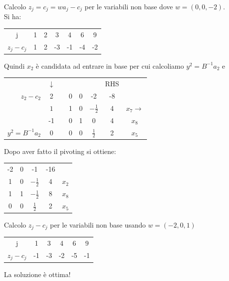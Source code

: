 Calcolo $z_{j}=c_{j}=w a_{j}-c_{j}$ per le variabili non base dove $w=(0,0,-2)$.\\
Si ha:
\begin{table}[h]
	\centering
	\begin{tabular}{c|cccccc}
		j & 1 & 2 & 3 & 4 & 6 & 9 \\ \cline{2-7}
		$z_{j}-c_{j}$ & 1 & 2 & -3 & -1 & -4 & -2
	\end{tabular}
\end{table}

Quindi $x_{2}$ è candidata ad entrare in base per cui calcoliamo $y^{2}=B^{-1}a_{2}$ e
\begin{table}[!h]
	\centering
	\def\arraystretch{1}
	\begin{tabular}{r|c|c|ccc|c|c}
		\multicolumn{1}{c}{} & \multicolumn{1}{c}{$\downarrow$} & \multicolumn{1}{c}{} &  &  & \multicolumn{1}{c}{} & \multicolumn{1}{c}{RHS} & \\ \cline{2-2} \cline{4-7}
		$z_{2}-c_{2}$ & 2 &  & 0 & 0 & -2 & -8 &  \\ \cline{2-2} \cline{4-7}
		& {\LARGE \textcircled{\normalsize $1$}} &  & 1 & 0 & $-\frac{1}{2}$ & 4 & $x_{7}\rightarrow$ \\
		& -1 &  & 0 & 1 & 0 & 4 & $x_{8}$ \\
		$y^{2}=B^{-1}a_{2}$ & 0 &  & 0 & 0 & $\frac{1}{2}$ & 2 & $x_{5}$ \\
		\cline{2-2} \cline{4-7}
	\end{tabular}
\end{table}
\clearpage
Dopo aver fatto il pivoting si ottiene:
\begin{table}[!h]
	\centering
	\begin{tabular}{|ccc|c|c}
		\cline{1-4}
		-2 & 0 & -1 & -16 &  \\ \cline{1-4}
		1 & 0 & $-\frac{1}{2}$ & 4 & $x_{2}$ \\
		1 & 1 & $-\frac{1}{2}$ & 8 & $x_{8}$ \\
		0 & 0 & $\frac{1}{2}$ & 2 & $x_{5}$ \\ \cline{1-4}
	\end{tabular}
\end{table}
Calcolo $z_{j}-c_{j}$ per le variabili non base usando $w=(-2,0,1)$
\begin{table}[h]
	\centering
	\begin{tabular}{c|ccccc}
		j & 1 & 3 & 4 & 6 & 9 \\ \cline{2-6}
		$z_{j}-c_{j}$ & -1 & -3 & -2 & -5 & -1
	\end{tabular}
\end{table}
La soluzione è ottima!

